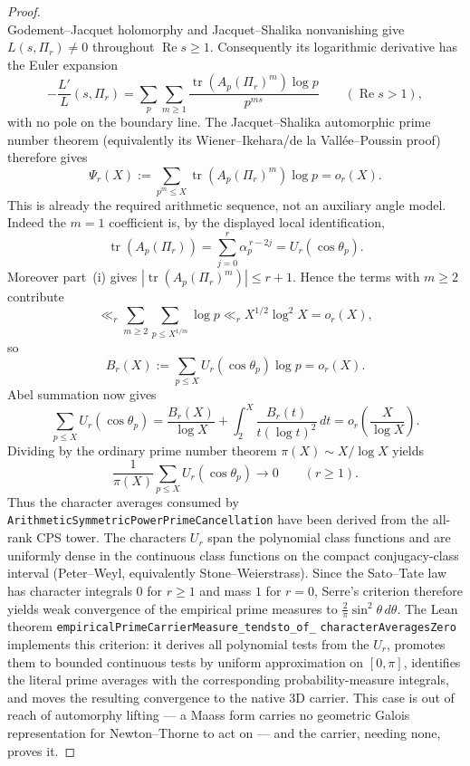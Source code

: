 \documentclass[11pt]{article}
\theoremstyle{definition}
\renewcommand{\Re}{\operatorname{Re}}
\begin{document}
\begin{proof}
\[\]
Godement--Jacquet holomorphy and Jacquet--Shalika nonvanishing \cite{GJa,JS} give
$L(s,\Pi_r)\ne0$ throughout $\Re s\ge1$.  Consequently its logarithmic derivative has the
Euler expansion
\[
 -\frac{L'}{L}(s,\Pi_r)
 =\sum_{p}\sum_{m\ge1}
   \frac{\operatorname{tr}(A_p(\Pi_r)^m)\log p}{p^{ms}}
 \qquad(\Re s>1),
\]
with no pole on the boundary line.  The Jacquet--Shalika automorphic prime number theorem
(equivalently its Wiener--Ikehara/de la Vall\'ee--Poussin proof) therefore gives
\[
 \Psi_r(X):=\sum_{p^m\le X}
   \operatorname{tr}(A_p(\Pi_r)^m)\log p=o_r(X).
\]
This is already the required arithmetic sequence, not an auxiliary angle model.  Indeed the
$m=1$ coefficient is, by the displayed local identification,
\[
 \operatorname{tr}(A_p(\Pi_r))
   =\sum_{j=0}^{r}\alpha_p^{\,r-2j}=U_r(\cos\theta_p).
\]
Moreover part~(i) gives
$|\operatorname{tr}(A_p(\Pi_r)^m)|\le r+1$.  Hence the terms with $m\ge2$ contribute
\[
 \ll_r\sum_{m\ge2}\sum_{p\le X^{1/m}}\log p
 \ll_r X^{1/2}\log^2X=o_r(X),
\]
so
\[
 B_r(X):=\sum_{p\le X}U_r(\cos\theta_p)\log p=o_r(X).
\]
Abel summation now gives
\[
 \sum_{p\le X}U_r(\cos\theta_p)
 =\frac{B_r(X)}{\log X}
   +\int_{2}^{X}\frac{B_r(t)}{t(\log t)^2}\,dt
 =o_r\!\left(\frac{X}{\log X}\right).
\]
Dividing by the ordinary prime number theorem $\pi(X)\sim X/\log X$ yields
\[
  \frac1{\pi(X)}\sum_{p\le X}U_r(\cos\theta_p)\longrightarrow0
  \qquad(r\ge1).
\]
Thus the character averages consumed by
\texttt{ArithmeticSymmetricPowerPrimeCancellation} have been derived from the all-rank CPS tower.
The characters $U_r$ span the polynomial class functions and are uniformly
dense in the continuous class functions on the compact conjugacy-class interval (Peter--Weyl, equivalently
Stone--Weierstrass).  Since the Sato--Tate law has character integrals $0$ for $r\ge1$ and mass $1$ for
$r=0$, Serre's criterion \cite{Serre} therefore yields weak convergence of the empirical prime measures to
$\tfrac2\pi\sin^2\theta\,d\theta$.  The Lean theorem
\texttt{empiricalPrimeCarrierMeasure\_tendsto\_of\_}\allowbreak
\texttt{characterAveragesZero} implements this
criterion: it derives all polynomial tests from the $U_r$, promotes them to bounded continuous tests
by uniform approximation on $[0,\pi]$, identifies the literal prime averages with the corresponding
probability-measure integrals, and moves the resulting convergence to the native 3D carrier. This case is out of reach of automorphy lifting --- a Maass form carries no
geometric Galois representation for Newton--Thorne \cite{NT} to act on --- and the carrier, needing none,
proves it.
\end{proof}
\end{document}
